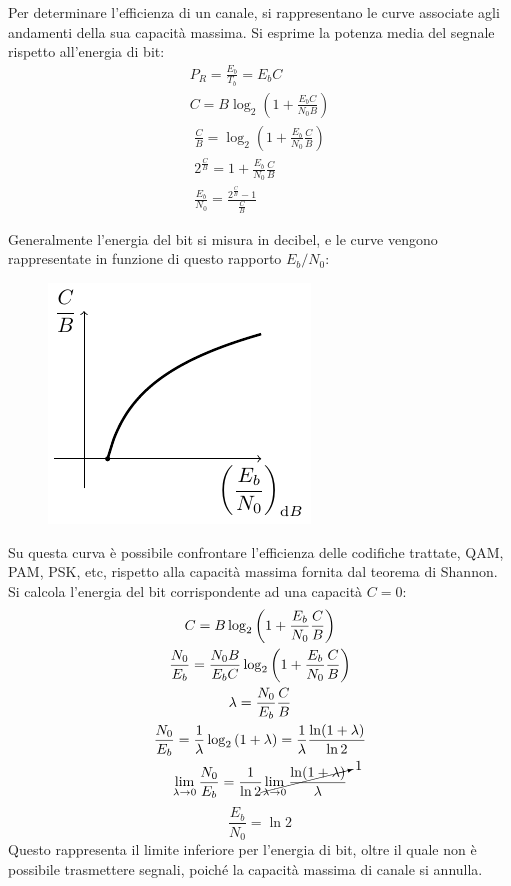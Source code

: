 \documentclass{article}
\numberwithin{equation}{subsection}
\begin{document}
Per determinare l'efficienza di un canale, si rappresentano le curve associate agli andamenti della sua capacità massima. Si esprime la potenza media del segnale 
rispetto all'energia di bit:
\begin{gather*}
    P_R=\displaystyle\frac{E_b}{T_b}=E_bC\\
    C=B\log_2\left(\displaystyle 1+\frac{E_bC}{N_0B}\right)
\end{gather*}
\begin{gather*}
    \displaystyle\frac{C}{B}=\log_2\left(1+\frac{E_b}{N_0}\frac{C}{B}\right)\\
    2^{\frac{C}{B}}=1+\displaystyle\frac{E_b}{N_0}\frac{C}{B}\\
    \displaystyle\frac{E_b}{N_0}=\frac{2^{\frac{C}{B}}-1}{\displaystyle\frac{C}{B}}
\end{gather*}

Generalmente l'energia del bit si misura in decibel, e le curve vengono rappresentate in funzione di questo rapporto $E_b/N_0$:
\begin{figure}[H]%
    \centering
    \includegraphics{shannon.pdf}
\end{figure}
Su questa curva è possibile confrontare l'efficienza delle codifiche trattate, QAM, PAM, PSK, etc, rispetto alla capacità massima fornita dal teorema di Shannon. 
Si calcola l'energia del bit corrispondente ad una capacità $C=0$:
\begin{gather*}
    C=B\log_2\left(\displaystyle 1+\frac{E_b}{N_0}\frac{C}{B}\right)\\
    \displaystyle\frac{N_0}{E_b}=\frac{N_0B}{E_bC}\log_2\left(1+\frac{E_b}{N_0}\frac{C}{B}\right)\\
    \lambda=\displaystyle\frac{N_0}{E_b}\frac{C}{B}\\
    \displaystyle\frac{N_0}{E_b}=\frac{1}{\lambda}\log_2\left(1+\lambda\right)=\frac{1}{\lambda}\frac{\ln(1+\lambda)}{\ln2}\\
    \lim_{\lambda\to0}\displaystyle\frac{N_0}{E_b}=\frac{1}{\ln2}\cancelto{1}{\lim_{\lambda\to0}\frac{\ln(1+\lambda)}{\lambda}}
\end{gather*}
\begin{equation}
    \displaystyle\frac{E_b}{N_0}=\ln2
\end{equation}
Questo rappresenta il limite inferiore per l'energia di bit, oltre il quale non è possibile trasmettere segnali, poiché la capacità massima di canale si annulla.  
\end{document}
